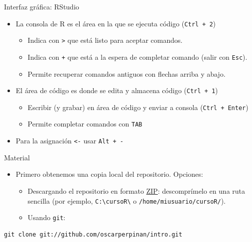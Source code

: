 \documentclass[xcolor={usenames,svgnames,dvipsnames}]{beamer}
\begin{document}
\begin{frame}[fragile,label={sec:orgheadline2}]{Interfaz gráfica: RStudio}
 \begin{itemize}
\item La consola de R es el área en la que se ejecuta código (\texttt{Ctrl + 2})
\begin{itemize}
\item Indica con \texttt{>} que está listo para aceptar comandos.
\item Indica con \texttt{+} que está a la espera de completar comando (salir con \texttt{Esc}).
\item Permite recuperar comandos antiguos con flechas arriba y abajo.
\end{itemize}
\item El área de código es donde se edita y almacena código (\texttt{Ctrl + 1})
\begin{itemize}
\item Escribir (y grabar) en área de código y enviar a consola (\texttt{Ctrl + Enter})
\item Permite completar comandos con \texttt{TAB}
\end{itemize}
\item Para la asignación \texttt{<-} usar \texttt{Alt + -}
\end{itemize}
\end{frame}

\begin{frame}[fragile,label={sec:orgheadline3}]{Material}
 \begin{itemize}
\item Primero obtenemos una copia local del repositorio. Opciones:

\begin{itemize}
\item Descargando el repositorio en formato \href{https://github.com/oscarperpinan/intro/archive/master.zip}{ZIP}: descomprímelo en una ruta sencilla (por ejemplo, \texttt{C:\textbackslash{}cursoR\textbackslash{}} o \texttt{/home/miusuario/cursoR/}).

\item Usando \texttt{git}:
\end{itemize}
\end{itemize}
\lstset{language=sh,label= ,caption= ,captionpos=b,numbers=none}
\begin{lstlisting}
git clone git://github.com/oscarperpinan/intro.git
\end{lstlisting}
\end{frame}
\end{document}
